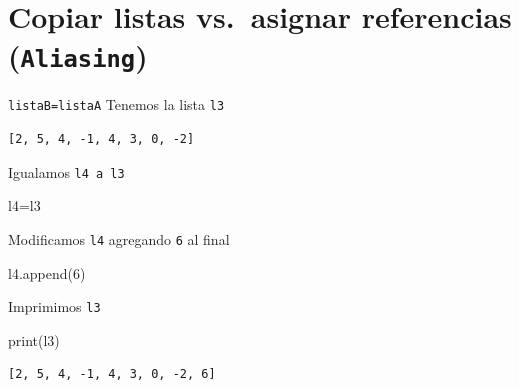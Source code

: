 \documentclass[
  ignorenonframetext,
  aspectratio=169,
  spanish,
]{beamer}
\newenvironment{Shaded}{\begin{snugshade}}{\end{snugshade}}
\newcommand{\BuiltInTok}[1]{\textcolor[rgb]{0.00,0.23,0.31}{#1}}
\newcommand{\DecValTok}[1]{\textcolor[rgb]{0.68,0.00,0.00}{#1}}
\newcommand{\NormalTok}[1]{\textcolor[rgb]{0.00,0.23,0.31}{#1}}
\newcommand{\OperatorTok}[1]{\textcolor[rgb]{0.37,0.37,0.37}{#1}}
\begin{document}
\section{\texorpdfstring{Copiar listas vs.~asignar referencias
(\texttt{Aliasing})}{Copiar listas vs.~asignar referencias (Aliasing)}}\label{copiar-listas-vs.-asignar-referencias-aliasing}

\begin{frame}[fragile]{\texttt{listaB=listaA}}
\label{listablistaa}
Tenemos la lista \texttt{l3}

\begin{verbatim}
[2, 5, 4, -1, 4, 3, 0, -2]
\end{verbatim}

Igualamos \texttt{l4\ a\ l3}

\begin{Shaded}
\begin{Highlighting}[]
\NormalTok{l4}\OperatorTok{=}\NormalTok{l3  }
\end{Highlighting}
\end{Shaded}

Modificamos \texttt{l4} agregando \texttt{6} al final

\begin{Shaded}
\begin{Highlighting}[]
\NormalTok{l4.append(}\DecValTok{6}\NormalTok{)}
\end{Highlighting}
\end{Shaded}

Imprimimos \texttt{l3}

\begin{Shaded}
\begin{Highlighting}[]
\BuiltInTok{print}\NormalTok{(l3) }
\end{Highlighting}
\end{Shaded}

\begin{verbatim}
[2, 5, 4, -1, 4, 3, 0, -2, 6]
\end{verbatim}
\end{frame}
\end{document}
